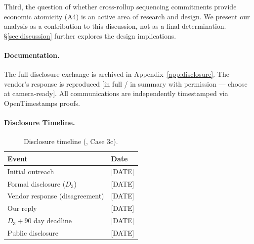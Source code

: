 Third, the question of whether cross-rollup sequencing commitments provide
economic atomicity (A4) is an active area of research and design. We present
our analysis as a contribution to this discussion, not as a final determination.
\S\ref{sec:discussion} further explores the design implications.

\paragraph{Documentation.}
The full disclosure exchange is archived in Appendix~\ref{app:disclosure}.
The vendor's response is reproduced [in full / in summary with permission —
choose at camera-ready]. All communications are independently timestamped
via OpenTimestamps proofs.

\paragraph{Disclosure Timeline.}

\begin{table}[h]
\centering
\caption{Disclosure timeline (\DEPLOYEDAPP{}, Case 3c).}
\label{tab:disclosure-timeline-3c}
\begin{tabular}{ll}
\toprule
Event & Date \\
\midrule
Initial outreach & [DATE] \\
Formal disclosure ($D_3$) & [DATE] \\
Vendor response (disagreement) & [DATE] \\
Our reply & [DATE] \\
$D_3 + 90$ day deadline & [DATE] \\
Public disclosure & [DATE] \\
\bottomrule
\end{tabular}
\end{table}
